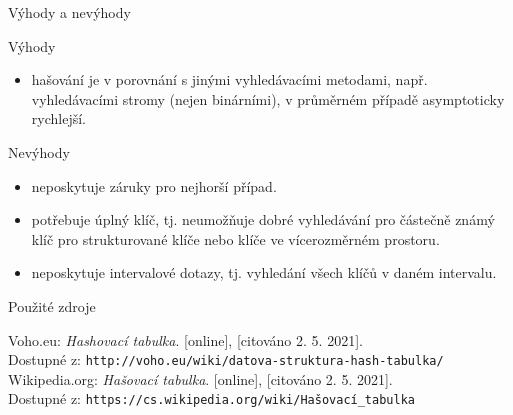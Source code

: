 \documentclass[utf8x]{beamer}
\begin{document}
\begin{frame}{Výhody a nevýhody}
    \begin{block}{Výhody}
    \begin{itemize}[<+->]
    
    	\item{hašování je v porovnání s jinými vyhledávacími metodami, např. vyhledávacími stromy (nejen binárními), v průměrném případě asymptoticky rychlejší.}
    	
    \end{itemize}
    \end{block}
    
    \begin{block}{Nevýhody}
     \begin{itemize}[<+->]
     
        \item { neposkytuje záruky pro nejhorší případ.}
		
        \item {potřebuje úplný klíč, tj. neumožňuje dobré vyhledávání pro částečně známý klíč pro strukturované klíče nebo klíče ve vícerozměrném prostoru.}
        
        \item {neposkytuje intervalové dotazy, tj. vyhledání všech klíčů v daném intervalu.}
         \end{itemize}
        
    \end{block}
\end{frame}

\appendix

\begin{frame}{Použité zdroje}
\begin{thebibliography}{}

\bibitem{} Voho.eu:
    \emph{Hashovací tabulka}. [online], [citováno 2. 5. 2021].\\
    Dostupné z: \texttt{http://voho.eu/wiki/datova-struktura-hash-tabulka/}
\vspace{2mm}
\bibitem{} Wikipedia.org:
    \emph{Hašovací tabulka}. [online], [citováno 2. 5. 2021].\\
    Dostupné z: \texttt{https://cs.wikipedia.org/wiki/Hašovací\_tabulka}

\end{thebibliography}
\end{frame}
\end{document}
